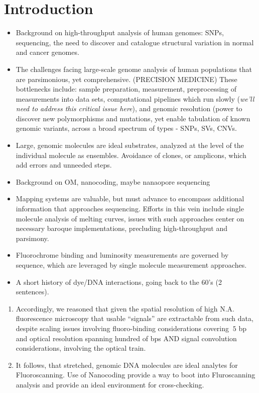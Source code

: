\documentclass[11pt]{extarticle} %
\begin{document}
\section*{Introduction}
\begin{itemize}
\item Background on high-throughput analysis of human genomes: SNPs, sequencing, the need to discover and catalogue structural variation in normal and cancer genomes.
\item The challenges facing large-scale genome analysis of human populations that are parsimonious, yet comprehensive. (PRECISION MEDICINE) These bottlenecks include: sample preparation, measurement, preprocessing of measurements into data sets, computational pipelines which run slowly ({\emph{we’ll need to address this critical issue here}}), and genomic resolution (power to discover new polymorphisms and mutations, yet enable tabulation of known genomic variants, across a broad spectrum of types - SNPs, SVs, CNVs.
\item Large, genomic molecules are ideal substrates, analyzed at the level of the individual molecule as ensembles. Avoidance of clones, or amplicons, which add errors and unneeded steps.
\item Background on OM, nanocoding, maybe nanaopore sequencing
\item Mapping systems are valuable, but must advance to encompass additional information that approaches sequencing. Efforts in this vein include single molecule analysis of melting curves, issues with such approaches center on necessary baroque implementations, precluding high-throughput and parsimony.
\item Fluorochrome binding and luminosity measurements are governed by sequence, which are leveraged by single molecule measurement approaches. 
\item A short history of dye/DNA interactions, going back to the 60’s (2 sentences).
\end{itemize}

\begin{enumerate}
\item Accordingly, we reasoned that given the spatial resolution of high N.A. fluorescence microscopy that usable ``signals'' are extractable from such data, despite scaling issues involving fluoro-binding considerations covering $~5$ bp and optical resolution spanning hundred of bps AND signal convolution considerations, involving the optical train.
\item It follows, that stretched, genomic DNA molecules are ideal analytes for Fluoroscanning. Use of Nanocoding provide a way to boot into Fluroscanning analysis and provide an ideal environment for cross-checking.
\end{enumerate}
\end{document}
